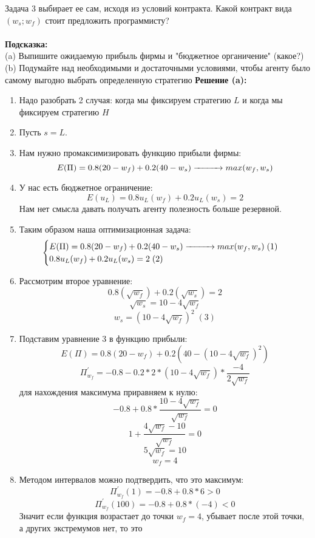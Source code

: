 \begin{mybox}{Задача 3}
    выбирает ее сам, исходя из условий контракта. Какой контракт вида $(w_s;w_f)$ стоит предложить программисту?\\\\
    \textbf{Подсказка:}\\
    \indent\setlength{\parindent}{1em}(a) Выпишите ожидаемую прибыль фирмы и "бюджетное органичение" (какое?)\\
    \indent\setlength{\parindent}{1em}(b) Подумайте над необходимыми и достаточными условиями, чтобы агенту было
    самому выгодно выбрать определенную стратегию
    \tcblower
    \textbf{Решение (a):}
    \begin{enumerate}
        \item Надо разобрать 2 случая: когда мы фиксируем стратегию $L$ и когда мы фиксируем стратегию $H$
        \item Пусть $s=L$.
        \item Нам нужно промаксимизировать функцию прибыли фирмы: $$E(\Pi)=0.8(20-w_f)+0.2(40-w_s)\xrightarrow{\makebox[1cm]{}} max(w_f,w_s)$$
        \item У нас есть бюджетное ограничение: $$E(u_L)=0.8u_L(w_f)+0.2u_L(w_s)=2$$ Нам нет смысла давать получать
        агенту полезность больше резервной.
        \item Таким образом наша оптимизационная задача: $$\begin{cases}
            E(\Pi)=0.8(20-w_f)+0.2(40-w_s)\xrightarrow{\makebox[1cm]{}} max(w_f,w_s) \;(1)\\
            0.8u_L(w_f)+0.2u_L(w_s)=2\; (2) \\
        \end{cases}$$
        \item Рассмотрим второе уравнение: $$0.8(\sqrt{w_f})+0.2(\sqrt{w_s})=2$$
        $$\sqrt{w_s}=10-4\sqrt{w_f}$$
        $$w_s=(10-4\sqrt{w_f})^2\;(3)$$
        \item Подставим уравнение 3 в функцию прибыли: $$E(\Pi)=0.8(20-w_f)+0.2(40-(10-4\sqrt{w_f})^2)$$
        $$\Pi^{'}_{w_f}=-0.8-0.2*2*(10-4\sqrt{w_f})*\frac{-4}{2\sqrt{w_f}}$$ для нахождения максимума приравняем к
        нулю:
        $$-0.8+0.8*\frac{10-4\sqrt{w_f}}{\sqrt{w_f}}=0$$
        $$1+\frac{4\sqrt{w_f}-10}{\sqrt{w_f}}=0$$
        $$5\sqrt{w_f}=10$$
        $$w_f=4$$
        \item Методом интервалов можно подтвердить, что это максимум:
        $$\Pi^{'}_{w_f}(1)=-0.8+0.8*6>0$$
        $$\Pi^{'}_{w_f}(100)=-0.8+0.8*(-4)<0$$
        Значит если функция возрастает до точки $w_f=4$, убывает после этой точки, а других экстремумов нет, то это

\end{enumerate}
\end{mybox}
